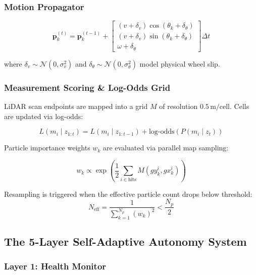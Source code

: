 \documentclass[11pt,a4paper]{article}
\begin{document}
\subsubsection{Motion Propagator}

\begin{equation}
\mathbf{p}_k^{(t)} = \mathbf{p}_k^{(t-1)} + \begin{bmatrix} (v + \delta_v) \cos(\theta_k + \delta_\theta) \\ (v + \delta_v) \sin(\theta_k + \delta_\theta) \\ \omega + \delta_\theta \end{bmatrix} \Delta t
\end{equation}

where $\delta_v \sim \mathcal{N}(0, \sigma_v^2)$ and $\delta_\theta \sim \mathcal{N}(0, \sigma_\theta^2)$ model physical wheel slip.

\subsubsection{Measurement Scoring \& Log-Odds Grid}

LiDAR scan endpoints are mapped into a grid $M$ of resolution $0.5\,\text{m/cell}$. Cells are updated via log-odds:

\begin{equation}
L(m_i \mid z_{1:t}) = L(m_i \mid z_{1:t-1}) + \text{log-odds}(P(m_i \mid z_t))
\end{equation}

Particle importance weights $w_k$ are evaluated via parallel map sampling:

\begin{equation}
w_k \propto \exp\left( \frac{1}{2} \sum_{i \in \text{hits}} M(gy_k^i, gx_k^i) \right)
\end{equation}

Resampling is triggered when the effective particle count drops below threshold:
\begin{equation}
    N_{\text{eff}} = \frac{1}{\sum_{k=1}^{N_p} (w_k)^2} < \frac{N_p}{2}
\end{equation}

\subsection{The 5-Layer Self-Adaptive Autonomy System}

\subsubsection{Layer 1: Health Monitor}
\end{document}
